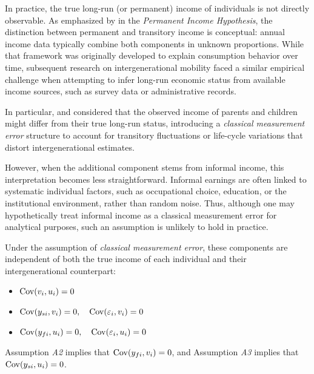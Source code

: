 In practice, the true long-run (or permanent) income of individuals is not directly observable.
As emphasized by \textcite{friedman1957consumption} in the \textit{Permanent Income Hypothesis}, the distinction between permanent and transitory income is conceptual: annual income data typically combine both components in unknown proportions.
While that framework was originally developed to explain consumption behavior over time, subsequent research on intergenerational mobility faced a similar empirical challenge when attempting to infer long-run economic status from available income sources, such as survey data or administrative records.

In particular, \textcite{Solon_1992} and \textcite{Zimmerman_1992} considered that the observed income of parents and children might differ from their true long-run status, introducing a \textit{classical measurement error} structure to account for transitory fluctuations or life-cycle variations that distort intergenerational estimates.

However, when the additional component stems from informal income, this interpretation becomes less straightforward.  
Informal earnings are often linked to systematic individual factors, such as occupational choice, education, or the institutional environment, rather than random noise.  
Thus, although one may hypothetically treat informal income as a classical measurement error for analytical purposes, such an assumption is unlikely to hold in practice. 

\begin{assumption}
Under the assumption of \textit{classical measurement error}, these components are independent of both the true income of each individual and their intergenerational counterpart:
\begin{itemize}
    \item[A1.] $\operatorname{Cov}(v_i,u_i) = 0$
    \item[A2.] $\operatorname{Cov}(y_{si},v_i) = 0, \quad \operatorname{Cov}(\varepsilon_i,v_i)=0$
    \item[A3.] $\operatorname{Cov}(y_{fi},u_i) = 0, \quad \operatorname{Cov}(\varepsilon_i,u_i)=0$
\end{itemize}
\end{assumption}

Assumption \emph{A2} implies that $\operatorname{Cov}(y_{fi},v_i)=0$, and Assumption \emph{A3} implies that $\operatorname{Cov}(y_{si},u_i)=0$.

